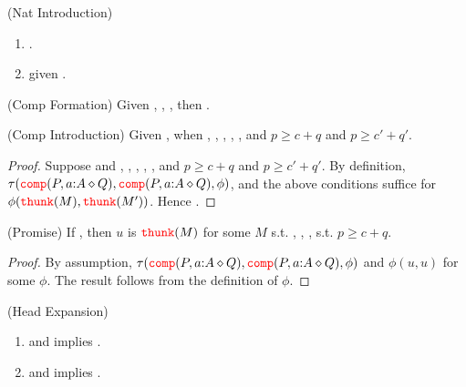 \begin{lemma}(Nat Introduction)
  \begin{enumerate}
    \item \eqVal{\zero}{\zero}{\nat}. 
    \item {} given .
  \end{enumerate}
\end{lemma}

\begin{lemma}(Comp Formation)
  Given , , , then
  .
\end{lemma}

\begin{lemma}(Comp Introduction)
  Given , 
   when 
  , , , 
  , , and 
  $p \ge c + q$ and $p \ge c' + q'$.
\end{lemma}

\begin{proof}
  Suppose  and 
  , , , 
  , , and 
  $p \ge c + q$ and $p \ge c' + q'$.
  By definition, $\tau({\color{red}{\mathtt{comp}}}(P, a {:} A \diamond Q), {\color{red}{\mathtt{comp}}}(P, a {:} A \diamond Q), \phi)$, and 
  the above conditions suffice for $\phi({\color{red}{\mathtt{thunk}}}(M),{\color{red}{\mathtt{thunk}}}(M'))$. Hence 
  .
\end{proof}

\begin{lemma}(Promise)
  If , 
  then $u$ is ${\color{red}{\mathtt{thunk}}}(M)$ for some $M$ s.t. , ,
  , 
  s.t. $p \ge c + q$.
\end{lemma}

\begin{proof}
  By assumption, $\tau({\color{red}{\mathtt{comp}}}(P, a {:} A \diamond Q), {\color{red}{\mathtt{comp}}}(P, a {:} A \diamond Q), \phi)$ and 
  $\phi(u,u)$ for some $\phi$. The result follows from the definition of $\phi$.
\end{proof}

\begin{lemma}(Head Expansion)
  \begin{enumerate}
    \item {} and  implies .
    \item {} and  implies .
  \end{enumerate}
\end{lemma}

